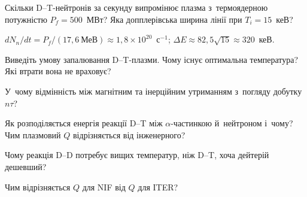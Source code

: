 \begin{problem}\label{prb:NeutronYield}
	Скільки D--T-нейтронів за секунду випромінює плазма з~термоядерною потужністю $P_f=500$~МВт? Яка допплерівська ширина лінії при $T_i=15$~кеВ?
	\begin{solution}
		$dN_n/dt=P_f/(17{,}6~\text{МеВ})\approx1{,}8\times10^{20}$~с$^{-1}$; $\Delta E\approx82{,}5\sqrt{15}\approx320$~кеВ.
	\end{solution}
\end{problem}


\begin{Questions}
\begin{quizlist}
\item Виведіть умову запалювання D--T-плазми. Чому існує оптимальна температура?
		  Які втрати вона не враховує?

\item У~чому відмінність між магнітним та інерційним утриманням з~погляду добутку
		  $n\tau$?

\item Як розподіляється енергія реакції D--T між $\alpha$-частинкою й~нейтроном
		  і~чому? Чим плазмовий $Q$ відрізняється від інженерного?

\item Чому реакція D--D потребує вищих температур, ніж D--T, хоча дейтерій дешевший?

\item Чим відрізняється $Q$ для NIF від $Q$ для ITER?
\end{quizlist}
\end{Questions}

